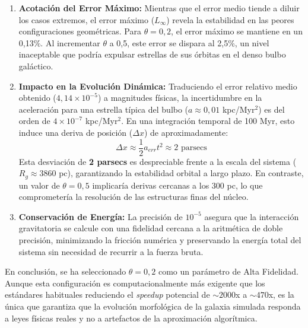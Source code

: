 \begin{enumerate}
    \item \textbf{Acotación del Error Máximo:} Mientras que el error medio tiende a diluir los casos extremos, el error máximo ($L_\infty$) revela la estabilidad en las peores configuraciones geométricas. Para $\theta = 0,2$, el error máximo se mantiene en un 0,13\%. Al incrementar $\theta$ a 0,5, este error se dispara al 2,5\%, un nivel inaceptable que podría expulsar estrellas de sus órbitas en el denso bulbo galáctico.

    \item \textbf{Impacto en la Evolución Dinámica:} Traduciendo el error relativo medio obtenido ($4,14 \times 10^{-5}$) a magnitudes físicas, la incertidumbre en la aceleración para una estrella típica del bulbo ($a \approx 0,01$ kpc/Myr$^2$) es del orden de $4 \times 10^{-7}$ kpc/Myr$^2$. En una integración temporal de 100 Myr, esto induce una deriva de posición ($\Delta x$) de aproximadamente:
    \begin{equation}
        \Delta x \approx \frac{1}{2} a_{err} t^2 \approx 2 \text{ parsecs}
    \end{equation}
    Esta desviación de \textbf{2 parsecs} es despreciable frente a la escala del sistema ($R_g \approx 3860$ pc), garantizando la estabilidad orbital a largo plazo.
    En contraste, un valor de $\theta=0,5$ implicaría derivas cercanas a los 300 pc, lo que comprometería la resolución de las estructuras finas del núcleo.

    \item \textbf{Conservación de Energía:} La precisión de $10^{-5}$ asegura que la interacción gravitatoria se calcule con una fidelidad cercana a la aritmética de doble precisión, minimizando la fricción numérica y preservando la energía total del sistema sin necesidad de recurrir a la fuerza bruta.
\end{enumerate}

En conclusión, se ha seleccionado $\theta = 0,2$ como un parámetro de Alta Fidelidad.
Aunque esta configuración es computacionalmente más exigente que los estándares habituales reduciendo el \textit{speedup} potencial de $\sim 2000$x a $\sim 470$x, es la única que garantiza que la evolución morfológica de la galaxia simulada responda a leyes físicas reales y no a artefactos de la aproximación algorítmica.

